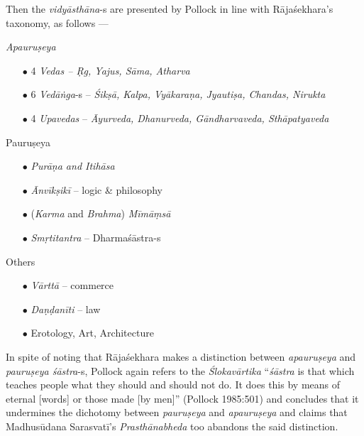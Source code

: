 Then the {\sl vidyāsthāna}-s are presented by Pollock in line with Rājaśekhara's taxonomy, as follows ---

{\sl Apauruṣeya}
\begin{itemize}
\item[$\bullet$] 4 {\sl Vedas -- Ṛg, Yajus, Sāma, Atharva}

\item[$\bullet$] 6 {\sl Vedāṅga}-s -- {\sl Śikṣā, Kalpa, Vyākaraṇa, Jyautiṣa, Chandas, Nirukta}

\item[$\bullet$] 4 {\sl Upavedas} -- {\sl Āyurveda, Dhanurveda, Gāndharvaveda, Sthāpatyaveda}
\end{itemize}

Pauruṣeya
\begin{itemize}
\item[$\bullet$] {\sl Purāṇa and Itihāsa}

\item[$\bullet$] {\sl Ānvīkṣikī} -- logic \& philosophy

\item[$\bullet$] ({\sl Karma} and {\sl Brahma}) {\sl Mīmāṃsā}

\item[$\bullet$] {\sl Smṛtitantra} -- Dharmaśāstra-s
\end{itemize}

Others
\begin{itemize}
\item[$\bullet$] {\sl Vārttā} -- commerce

\item[$\bullet$] {\sl Daṇḍanīti} -- law

\item[$\bullet$] Erotology, Art, Architecture
\end{itemize}

In spite of noting that Rājaśekhara makes a distinction between {\sl apauruṣeya} and {\sl pauruṣeya śāstra}-s, Pollock again refers to the {\sl Ślokavārtika} ``{\sl śāstra} is that which teaches people what they should and should not do. It does this by means of eternal [words] or those made [by men]'' (Pollock 1985:501) and concludes that it undermines the dichotomy between {\sl pauruṣeya} and {\sl apauruṣeya} and claims that Madhusūdana Sarasvatī's  {\sl Prasthānabheda} too abandons the said distinction. 


